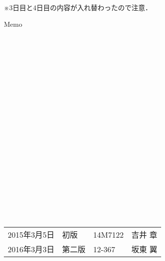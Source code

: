 \documentclass[11pt]{jarticle}
\begin{document}
※3日目と4日目の内容が入れ替わったので注意．

\begin{itembox}[l]{Memo}
　\\
　\\
　\\
　\\
　\\
　\\
　\\
　\\
　\\
　\\
　\\
　\\
　\\
　\\
　\\
　\\
　\\
　\\
　\\
　\\
　\\
\end{itembox}



%
%
\vspace{1cm}
\begin{table}[b]
  \begin{flushright}
    \begin{tabular}{llll}
      2015年3月5日 & 初版 & 14M7122 & 吉井 章 \\
      2016年3月3日 & 第二版 & 12-367 & 坂東 翼
    \end{tabular}
  \end{flushright}
\end{table}
\end{document}
